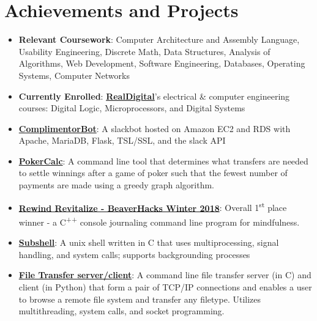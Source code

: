 \documentclass[letterpaper,11pt]{article}
\newcommand{\resumeItem}[2]{
  \item \small{
    \textbf{#1}{: #2 \vspace{-2pt}}
  }
}
\newcommand{\resumeSubItem}[2]{\resumeItem{#1}{#2}\vspace{-4pt}}
\newcommand{\resumeSubHeadingListStart}{\begin{itemize}[label=, leftmargin=*]}
\newcommand{\resumeSubHeadingListEnd}{\end{itemize}}
\begin{document}
\section{Achievements and Projects}
  \resumeSubHeadingListStart
    \resumeSubItem{Relevant Coursework}
      {Computer Architecture and Assembly Language, Usability Engineering, Discrete Math, Data Structures, Analysis of Algorithms, Web Development, Software Engineering, Databases, Operating Systems, Computer Networks}
    \resumeSubItem{Currently Enrolled}
    	{\textbf{\href{https://www.realdigital.org}{RealDigital}}'s electrical \& computer engineering courses: Digital Logic, Microprocessors, and Digital Systems}
    \resumeSubItem{\href{https://github.com/jordankbartos/complimentor-bot-v2}{ComplimentorBot}}{A slackbot hosted on Amazon EC2 and RDS with Apache, MariaDB, Flask, TSL/SSL, and the slack API}
    \resumeSubItem{\href{https://github.com/jordankbartos/PokerCalc}{PokerCalc}}
      {A command line tool that determines what transfers are needed to settle winnings after a game of poker such that the fewest number of payments are made using a greedy graph algorithm.}
    \resumeSubItem{\href{https://github.com/jkbartos/rewind-revitalize}{Rewind Revitalize - BeaverHacks Winter 2018}}{Overall 1\textsuperscript{st} place winner - a C\textsuperscript{++} console journaling command line program for mindfulness.}
    \resumeSubItem{\href{https://github.com/jordankbartos/subshell}{Subshell}}{A unix shell written in C that uses multiprocessing, signal handling, and system calls; supports backgrounding processes}
    \resumeSubItem{\href{https://github.com/jordankbartos/file-transfer-sc}{File Transfer server/client}}{A command line file transfer server (in C) and client (in Python) that form a pair of TCP/IP connections and enables a user to browse a remote file system and transfer any filetype. Utilizes multithreading, system calls, and socket programming.}
  \resumeSubHeadingListEnd
\hfill



\end{document}
